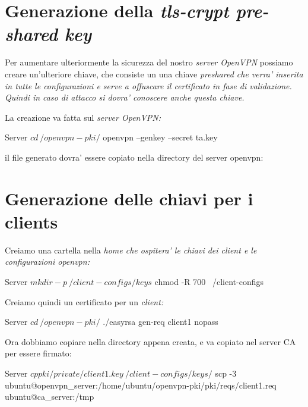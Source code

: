 \section{Generazione della \textit{tls-crypt pre-shared key}}
\label{sec:tls-crypt}

Per aumentare ulteriormente la sicurezza del nostro \textit{server OpenVPN} possiamo creare un'ulteriore chiave, che consiste un una chiave \it{preshared} che verra' inserita in tutte le configurazioni e serve a offuscare il certificato in fase di validazione. Quindi in caso di attacco si dovra' conoscere anche questa chiave.

La creazione va fatta sul \it{server OpenVPN}:

\begin{bashcode}{Server}{}
$ cd ~/openvpn-pki/
$ openvpn --genkey --secret ta.key
\end{bashcode}

il file generato  dovra' essere copiato nella directory del server openvpn:



\section{Generazione delle chiavi per i clients}
\label{sec:client_keys}

Creiamo una cartella nella \it{home} che ospitera' le chiavi dei \it{client} e le configurazioni openvpn:

\begin{bashcode}{Server}{}
$ mkdir -p ~/client-configs/keys
$ chmod -R 700 ~/client-configs
\end{bashcode}

Creiamo quindi un certificato per un \it{client}:

\begin{bashcode}{Server}{}
$ cd ~/openvpn-pki/
$ ./easyrsa gen-req client1 nopass
\end{bashcode}

Ora dobbiamo copiare  nella directory appena creata, e  va copiato nel server CA per essere firmato:

\begin{bashcode}{Server}{}
$ cp pki/private/client1.key ~/client-configs/keys/
$ scp -3 ubuntu@openvpn_server:/home/ubuntu/openvpn-pki/pki/reqs/client1.req ubuntu@ca_server:/tmp
\end{bashcode}

